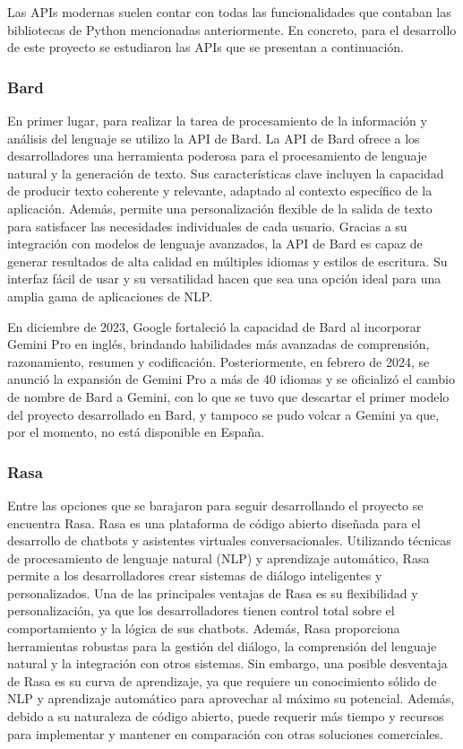 Las APIs modernas suelen contar con todas las funcionalidades que contaban las bibliotecas de Python mencionadas anteriormente. En concreto, para el desarrollo de este proyecto se estudiaron las APIs que se presentan a continuación.

\subsubsection{Bard}
En primer lugar, para realizar la tarea de procesamiento de la información y análisis del lenguaje se utilizo la API de Bard. La API de Bard ofrece a los desarrolladores una herramienta poderosa para el procesamiento de lenguaje natural y la generación de texto. Sus características clave incluyen la capacidad de producir texto coherente y relevante, adaptado al contexto específico de la aplicación. Además, permite una personalización flexible de la salida de texto para satisfacer las necesidades individuales de cada usuario. Gracias a su integración con modelos de lenguaje avanzados, la API de Bard es capaz de generar resultados de alta calidad en múltiples idiomas y estilos de escritura. Su interfaz fácil de usar y su versatilidad hacen que sea una opción ideal para una amplia gama de aplicaciones de NLP.

En diciembre de 2023, Google fortaleció la capacidad de Bard al incorporar Gemini Pro en inglés, brindando habilidades más avanzadas de comprensión, razonamiento, resumen y codificación. Posteriormente, en febrero de 2024, se anunció la expansión de Gemini Pro a más de 40 idiomas y se oficializó el cambio de nombre de Bard a Gemini, con lo que se tuvo que descartar el primer modelo del proyecto desarrollado en Bard, y tampoco se pudo volcar a Gemini ya que, por el momento, no está disponible en España. 

\subsubsection{Rasa}
Entre las opciones que se barajaron para seguir desarrollando el proyecto se encuentra Rasa. Rasa es una plataforma de código abierto diseñada para el desarrollo de chatbots y asistentes virtuales conversacionales. Utilizando técnicas de procesamiento de lenguaje natural (NLP) y aprendizaje automático, Rasa permite a los desarrolladores crear sistemas de diálogo inteligentes y personalizados. Una de las principales ventajas de Rasa es su flexibilidad y personalización, ya que los desarrolladores tienen control total sobre el comportamiento y la lógica de sus chatbots. Además, Rasa proporciona herramientas robustas para la gestión del diálogo, la comprensión del lenguaje natural y la integración con otros sistemas. Sin embargo, una posible desventaja de Rasa es su curva de aprendizaje, ya que requiere un conocimiento sólido de NLP y aprendizaje automático para aprovechar al máximo su potencial. Además, debido a su naturaleza de código abierto, puede requerir más tiempo y recursos para implementar y mantener en comparación con otras soluciones comerciales.

